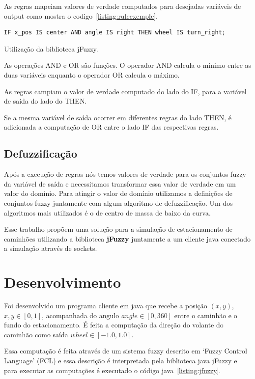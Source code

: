 \documentclass[12pt, a4paper]{article}
\begin{document}
As regras mapeiam valores de verdade computados para desejadas variáveis de output como mostra o codigo~\ref{listing:ruleexemple}.

\begin{listing}[h!]
  \begin{verbatim}
IF x_pos IS center AND angle IS right THEN wheel IS turn_right;
  \end{verbatim}
  \caption{Utilização da biblioteca jFuzzy.}\label{listing:ruleexemple}
\end{listing}

As operações AND e OR são funções. O operador AND calcula o minimo entre as duas variáveis enquanto o operador OR calcula o máximo.

As regras campiam o valor de verdade computado do lado do IF, para a variável de saída do lado do THEN\@.

Se a mesma variável de saída ocorrer em diferentes regras do lado THEN, é adicionada a computação de OR entre o lado IF das respectivas regras.

\subsection{Defuzzificação}

Após a execução de regras nós temos valores de verdade para os conjuntos fuzzy da variável de saída e necessitamos transformar essa valor de verdade em um valor do domínio.
Para atingir o valor de domínio utilizamos a definições de conjuntos fuzzy juntamente com algum algoritmo de defuzzificação.
Um dos algoritmos mais utilizados é o de centro de massa de baixo da curva.

Esse trabalho propõem uma solução para a simulação de estacionamento de
caminhões utilizando a biblioteca \textbf{jFuzzy} juntamente a um cliente
java conectado a simulação através de sockets.

\section{Desenvolvimento}

Foi desenvolvido um programa cliente em java que recebe a posição $(x, y)$, $x, y \in [0, 1]$,
acompanhada do angulo $angle \in [0, 360]$ entre o caminhão e o fundo do estacionamento.
É feita a computação da direção do volante do caminhão como saída $wheel \in [-1.0, 1.0]$.

Essa computação é feita através de um sistema fuzzy descrito em `Fuzzy Control Language' (FCL) e
essa descrição é interpretada pela biblioteca java jFuzzy e para executar as computações é executado
o código java~\ref{listing:jfuzzy}.
\end{document}
